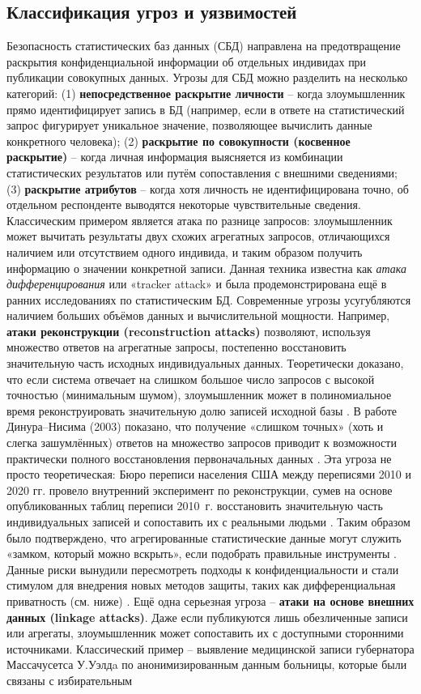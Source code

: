 \subsection{Классификация угроз и уязвимостей}
Безопасность статистических баз данных (СБД) направлена на предотвращение раскрытия конфиденциальной информации об отдельных индивидах при публикации совокупных данных. Угрозы для СБД можно разделить на несколько категорий: (1) \textbf{непосредственное раскрытие личности} – когда злоумышленник прямо идентифицирует запись в БД (например, если в ответе на статистический запрос фигурирует уникальное значение, позволяющее вычислить данные конкретного человека); (2) \textbf{раскрытие по совокупности (косвенное раскрытие)} – когда личная информация выясняется из комбинации статистических результатов или путём сопоставления с внешними сведениями; (3) \textbf{раскрытие атрибутов} – когда хотя личность не идентифицирована точно, об отдельном респонденте выводятся некоторые чувствительные сведения. Классическим примером является атака по разнице запросов: злоумышленник может вычитать результаты двух схожих агрегатных запросов, отличающихся наличием или отсутствием одного индивида, и таким образом получить информацию о значении конкретной записи. Данная техника известна как \textit{атака дифференцирования} или «tracker attack» и была продемонстрирована ещё в ранних исследованиях по статистическим БД. Современные угрозы усугубляются наличием больших объёмов данных и вычислительной мощности. Например, \textbf{атаки реконструкции (reconstruction attacks)} позволяют, используя множество ответов на агрегатные запросы, постепенно восстановить значительную часть исходных индивидуальных данных. Теоретически доказано, что если система отвечает на слишком большое число запросов с высокой точностью (минимальным шумом), злоумышленник может в полиномиальное время реконструировать значительную долю записей исходной базы \autocite{differentialprivacy-org}. В работе Динура–Нисима (2003) показано, что получение «слишком точных» (хоть и слегка зашумлённых) ответов на множество запросов приводит к возможности практически полного восстановления первоначальных данных \autocite{differentialprivacy-org}. Эта угроза не просто теоретическая: Бюро переписи населения США между переписями 2010 и 2020 гг. провело внутренний эксперимент по реконструкции, сумев на основе опубликованных таблиц переписи 2010~г. восстановить значительную часть индивидуальных записей и сопоставить их с реальными людьми \autocite{cornell-edu}. Таким образом было подтверждено, что агрегированные статистические данные могут служить «замком, который можно вскрыть», если подобрать правильные инструменты \autocite{cornell-edu}. Данные риски вынудили пересмотреть подходы к конфиденциальности и стали стимулом для внедрения новых методов защиты, таких как дифференциальная приватность (см. ниже) \autocite{cornell-edu}. Ещё одна серьезная угроза – \textbf{атаки на основе внешних данных (linkage attacks)}. Даже если публикуются лишь обезличенные записи или агрегаты, злоумышленник может сопоставить их с доступными сторонними источниками. Классический пример – выявление медицинской записи губернатора Массачусетса У.Уэлдa по анонимизированным данным больницы, которые были связаны с избирательным 